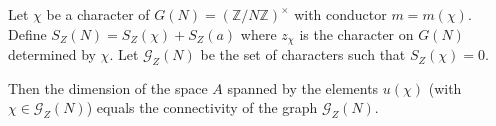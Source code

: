 Let $\chi$ be a character of $G(N) = (\mathbb{Z}/N\mathbb{Z})^\times$ with conductor $m = m(\chi)$. Define $S_Z(N) = S_Z(\chi) + S_Z(a)$ where $z_\chi$ is the character on $G(N)$ determined by $\chi$. Let $\mathcal{G}_Z(N)$ be the set of characters such that $S_Z(\chi) = 0$.

Then the dimension of the space $A$ spanned by the elements $u(\chi)$ (with $\chi \in \mathcal{G}_Z(N)$) equals the connectivity of the graph $\mathcal{G}_Z(N)$.